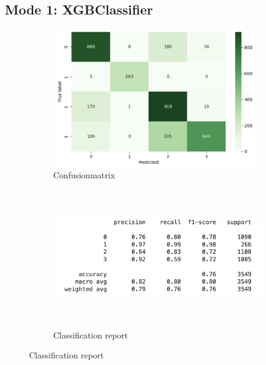 \documentclass{article}
\begin{document}
\subsection*{Mode 1: XGBClassifier}



\begin{figure}[h!] 
\begin{subfigure}{0.5\textwidth}
\includegraphics[width=0.9\linewidth, height=6cm]{images/XGBC_f.png} 
\centering
\caption{Confusionmatrix}
\label{fig:addendum_xcon}
\end{subfigure}
\begin{subfigure}{0.5\textwidth}
\includegraphics[width=0.9\linewidth, height=6cm]{images/XGBC_af.png} 
\centering
\caption{Classification report}
\label{fig:addendum_xclass}
\end{subfigure}
    
\end{figure}
\end{document}
